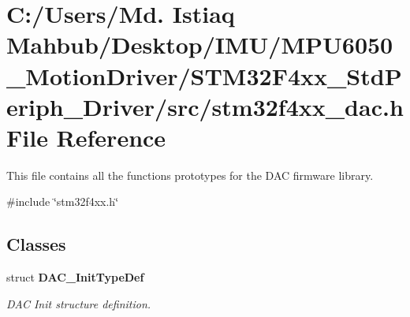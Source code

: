 \section{C\+:/\+Users/\+Md. Istiaq Mahbub/\+Desktop/\+I\+M\+U/\+M\+P\+U6050\+\_\+\+Motion\+Driver/\+S\+T\+M32\+F4xx\+\_\+\+Std\+Periph\+\_\+\+Driver/src/stm32f4xx\+\_\+dac.h File Reference}
\label{stm32f4xx__dac_8h}


This file contains all the functions prototypes for the D\+AC firmware library.  


{\ttfamily \#include \char`\"{}stm32f4xx.\+h\char`\"{}}\newline
\subsection*{Classes}
\begin{DoxyCompactItemize}
\item 
struct \textbf{ D\+A\+C\+\_\+\+Init\+Type\+Def}
\begin{DoxyCompactList}\small\item\em D\+AC Init structure definition. \end{DoxyCompactList}\end{DoxyCompactItemize}
